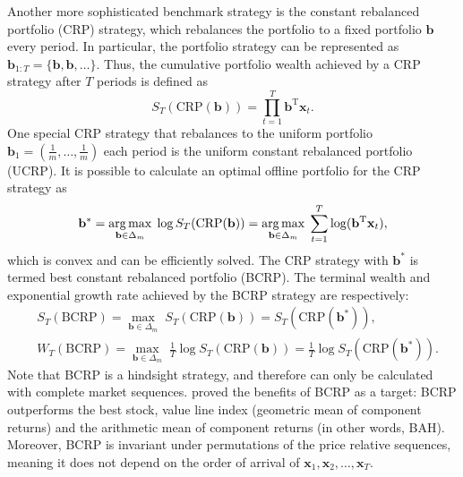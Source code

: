 Another more sophisticated benchmark strategy is the constant rebalanced portfolio (CRP) strategy, which rebalances the portfolio to a fixed portfolio $\mathbf{b}$ every period. In particular, the portfolio strategy can be represented as $\mathbf{b}_{1:T} = \{\mathbf{b}, \mathbf{b}, \ldots\}$. Thus, the cumulative portfolio wealth achieved by a CRP strategy after $T$ periods is defined as
\begin{equation}
	S_{T}(\mathrm{CRP}(\mathbf{b})) = \prod_{t=1}^T \mathbf{b}^\text{T}\mathbf{x}_t.
\end{equation}
One special CRP strategy that rebalances to the uniform portfolio $\mathbf{b}_1 = (\frac{1}{m}, \ldots, \frac{1}{m})$ each period is the uniform constant rebalanced portfolio (UCRP). It is possible to calculate an optimal offline portfolio for the CRP strategy as
\begin{equation}
	\mathbf{b}^* = \operatorname*{arg\,max}_{\mathbf{b} \in \Delta_m} \; \log S_{T}(\mathrm{CRP}(\mathbf{b}))
	= \operatorname*{arg\,max}_{\mathbf{b} \in \Delta_m} \; \sum_{t=1}^T \log(\mathbf{b}^\text{T}\mathbf{x}_t),
\end{equation}
which is convex and can be efficiently solved. The CRP strategy with $\mathbf{b}^*$ is termed best constant rebalanced portfolio (BCRP). The terminal wealth and exponential growth rate achieved by the BCRP strategy are respectively:
\begin{align}
	& S_{T}(\mathrm{BCRP}) = \max_{\mathbf{b} \in \Delta_m} \; S_{T}(\mathrm{CRP}(\mathbf{b})) = S_{T}(\mathrm{CRP}(\mathbf{b}^*)),
	\nonumber \\
	& W_{T}(\mathrm{BCRP}) = \max_{\mathbf{b} \in \Delta_m} \; \frac{1}{T}\log S_{T}(\mathrm{CRP}(\mathbf{b})) = \frac{1}{T}\log S_{T}(\mathrm{CRP}(\mathbf{b}^*)).
\end{align}
Note that BCRP is a hindsight strategy, and therefore can only be calculated with complete market sequences. \cite{cover} proved the benefits of BCRP as a target: BCRP outperforms the best stock, value line index (geometric mean of component returns) and the arithmetic mean of component returns (in other words, BAH). Moreover, BCRP is invariant under permutations of the price relative sequences, meaning it does not depend on the order of arrival of $\mathbf{x}_1, \mathbf{x}_2, \ldots, \mathbf{x}_T$.

